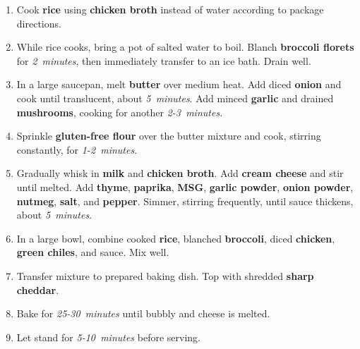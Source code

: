 \documentclass[11pt,letterpaper]{article}
\begin{document}
\begin{enumerate}
    \item Cook \textbf{rice} using \textbf{chicken broth} instead of water according to package directions.
    
    \item While rice cooks, bring a pot of salted water to boil. Blanch \textbf{broccoli florets} for \textit{2~minutes}, then immediately transfer to an ice bath. Drain well.
    
    \item In a large saucepan, melt \textbf{butter} over medium heat. Add diced \textbf{onion} and cook until translucent, about \textit{5~minutes}. Add minced \textbf{garlic} and drained \textbf{mushrooms}, cooking for another \textit{2-3~minutes}.
    
    \item Sprinkle \textbf{gluten-free flour} over the butter mixture and cook, stirring constantly, for \textit{1-2~minutes}.
    
    \item Gradually whisk in \textbf{milk} and \textbf{chicken broth}. Add \textbf{cream cheese} and stir until melted. Add \textbf{thyme}, \textbf{paprika}, \textbf{MSG}, \textbf{garlic powder}, \textbf{onion powder}, \textbf{nutmeg}, \textbf{salt}, and \textbf{pepper}. Simmer, stirring frequently, until sauce thickens, about \textit{5~minutes}.
    
    \item In a large bowl, combine cooked \textbf{rice}, blanched \textbf{broccoli}, diced \textbf{chicken}, \textbf{green chiles}, and sauce. Mix well.
    
    \item Transfer mixture to prepared baking dish. Top with shredded \textbf{sharp cheddar}.
    
    \item Bake for \textit{25-30~minutes} until bubbly and cheese is melted.
    
    \item Let stand for \textit{5-10~minutes} before serving.
\end{enumerate}
\end{document}
